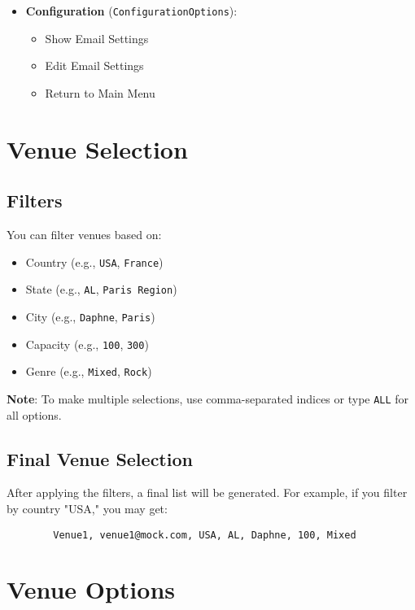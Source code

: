 \documentclass{article}
\begin{document}
\begin{itemize}
		\item \textbf{Configuration} (\texttt{ConfigurationOptions}):
		\begin{itemize}
			\item Show Email Settings
			\item Edit Email Settings
			\item Return to Main Menu
		\end{itemize}
	\end{itemize}
	
	\section{Venue Selection}
	
	\subsection{Filters}
	
	You can filter venues based on:
	
	\begin{itemize}
		\item Country (e.g., \texttt{USA}, \texttt{France})
		\item State (e.g., \texttt{AL}, \texttt{Paris Region})
		\item City (e.g., \texttt{Daphne}, \texttt{Paris})
		\item Capacity (e.g., \texttt{100}, \texttt{300})
		\item Genre (e.g., \texttt{Mixed}, \texttt{Rock})
	\end{itemize}
	
	\textbf{Note}: To make multiple selections, use comma-separated indices or type \texttt{ALL} for all options.
	
	\subsection{Final Venue Selection}
	
	After applying the filters, a final list will be generated. For example, if you filter by country "USA," you may get:
	
	\begin{verbatim}
		Venue1, venue1@mock.com, USA, AL, Daphne, 100, Mixed
	\end{verbatim}
	
	\section{Venue Options}
	
\end{document}
